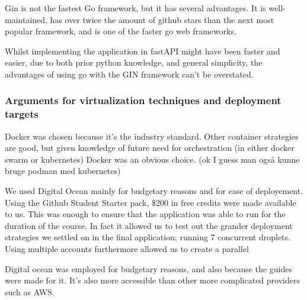 Gin is not the fastest Go framework, but it has several advantages. It is well-maintained, has over twice the 
amount of github stars than the next most popular framework, and is one of the faster go web frameworks.

Whilst implementing the application in fastAPI might have been faster and easier, due to both prior python 
knowledge, and general simplicity, the advantages of using go with the GIN framework can't be overstated. 

\subsubsection{Arguments for virtualization techniques and deployment targets}
Docker was chosen because it's the industry standard. Other container strategies are good, but given knowledge of future need for orchestration (in either docker swarm or kubernetes) Docker was an obvious choice.  (ok I guess man også kunne bruge podman med kubernetes)

We used Digital Ocean mainly for budgetary reasons and for ease of deployement. Using the Github Student Starter pack, \$200 in free credits were made available to us. This was enough to ensure that the application was able to run for the duration of the course. In fact it allowed us to test out the grander deployment strategies we settled on in the final application; running 7 concurrent droplets. Using multiple accounts furthermore allowed us to create a parallel  

Digital ocean was employed for budgetary reasons, and also because the guides were made for it.
It's also more accessible than other more complicated providers such as AWS. 

